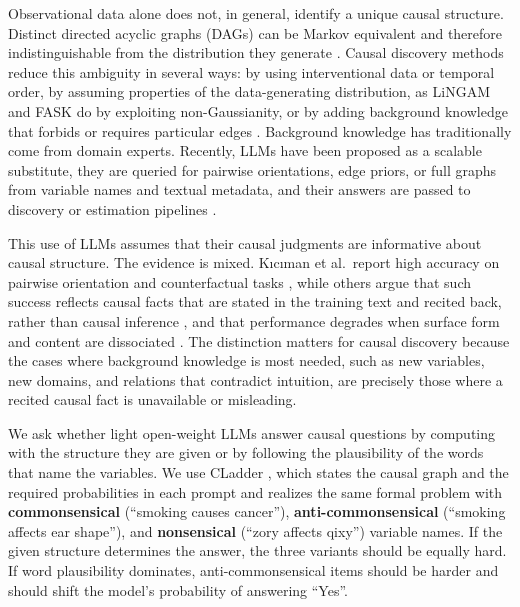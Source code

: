 \documentclass{llncs}
\begin{document}
Observational data alone does not, in general, identify a unique causal structure. Distinct directed acyclic graphs (DAGs) can be Markov equivalent and therefore indistinguishable from the distribution they generate \cite{verma1990equivalence,spirtes2000causation,glymour2019review}. Causal discovery methods reduce this ambiguity in several ways: by using interventional data or temporal order, by assuming properties of the data-generating distribution, as LiNGAM \cite{shimizu2006linear} and FASK \cite{sanchez2019estimating} do by exploiting non-Gaussianity, or by adding background knowledge that forbids or requires particular edges \cite{spirtes2016causal}. Background knowledge has traditionally come from domain experts. Recently, LLMs have been proposed as a scalable substitute, they are queried for pairwise orientations, edge priors, or full graphs from variable names and textual metadata, and their answers are passed to discovery or estimation pipelines \cite{long2023can,kiciman2023causal,zhang2023understanding,verma2025causal}.


This use of LLMs assumes that their causal judgments are informative about causal structure. The evidence is mixed. Kıcıman et al.\ report high accuracy on pairwise orientation and counterfactual tasks \cite{kiciman2023causal}, while others argue that such success reflects causal facts that are stated in the training text and recited back, rather than causal inference \cite{willig2022can,Zecevic2023CausalPL}, and that performance degrades when surface form and content are dissociated \cite{hobbhahn2022investigating,li2023counterfactual,chen2024clear}. The distinction matters for causal discovery because the cases where background knowledge is most needed, such as new variables, new domains, and relations that contradict intuition, are precisely those where a recited causal fact is unavailable or misleading.

We ask whether light open-weight LLMs answer causal questions by computing with the structure they are given or by following the plausibility of the words that name the variables. We use CLadder \cite{jin2023cladder}, which states the causal graph and the required probabilities in each prompt and realizes the same formal problem with \textbf{\textcolor{cComm}{commonsensical}} (``smoking causes cancer''), \textbf{\textcolor{cAnti}{anti-commonsensical}} (``smoking affects ear shape''), and \textbf{\textcolor{cNons}{nonsensical}} (``zory affects qixy'') variable names. If the given structure determines the answer, the three variants should be equally hard. If word plausibility dominates, anti-commonsensical items should be harder and should shift the model's probability of answering ``Yes''.
\end{document}
